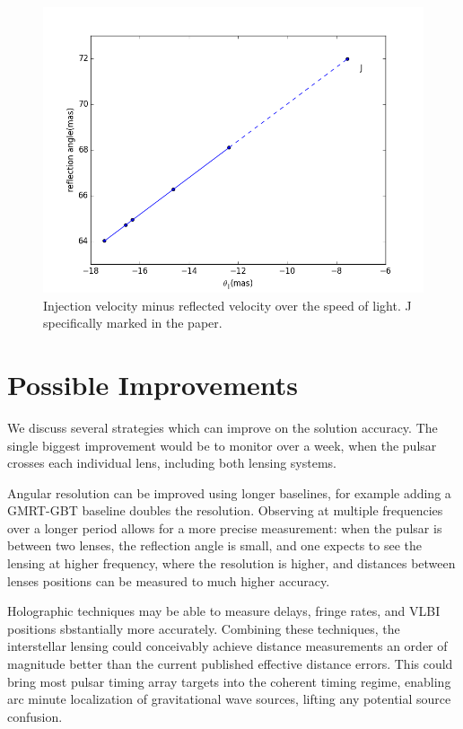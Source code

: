 \documentclass[useAMS,usenatbib]{mn2e}
\begin{document}
\begin{figure}
\centering
\includegraphics[width=1.0\textwidth,angle=0]{Reflection_angle.png}
\caption{Injection velocity minus reflected velocity over the speed of light. J specifically marked in the paper.}
\label{vtrans}
\end{figure}



\section{Possible Improvements}

We discuss several strategies which can improve on the solution
accuracy.  The single biggest improvement would be to monitor over a
week, when the pulsar crosses each individual lens, including both
lensing systems.

Angular resolution can be improved using longer baselines, for example
adding a GMRT-GBT baseline doubles the resolution.  Observing at
multiple frequencies over a longer period allows for a more precise
measurement: when the pulsar is between two lenses, the reflection
angle is small, and one expects to see the lensing at higher
frequency, where the resolution is higher, and distances between
lenses positions can be measured to much higher accuracy.

Holographic techniques\citep{2008MNRAS.388.1214W,2014MNRAS.440L..36P}
may be able to measure delays, fringe rates, and VLBI positions
sbstantially more accurately.  Combining these techniques, the
interstellar lensing could conceivably achieve distance measurements
an order of magnitude better than the current published effective
distance errors.  This could bring most pulsar timing array targets
into the coherent timing regime, enabling arc minute localization of
gravitational wave sources, lifting any potential source confusion.
\end{document}
